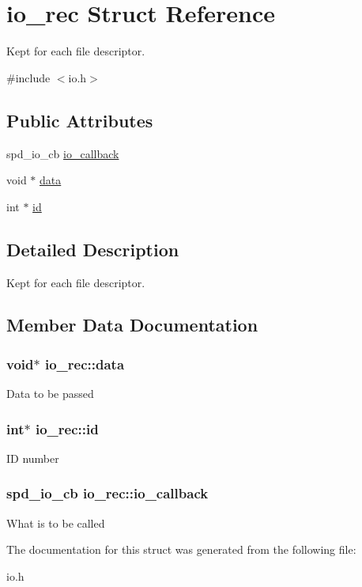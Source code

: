 \hypertarget{structio__rec}{
\section{io\_\-rec Struct Reference}
\label{structio__rec}
}


Kept for each file descriptor.  




{\ttfamily \#include $<$io.h$>$}

\subsection*{Public Attributes}
\begin{DoxyCompactItemize}
\item 
spd\_\-io\_\-cb \hyperlink{structio__rec_a8a4ed0da41995f158651e76ed0aa57d1}{io\_\-callback}
\item 
void $\ast$ \hyperlink{structio__rec_ae75ebfdf9bef281f3dc6aeecc2b91454}{data}
\item 
int $\ast$ \hyperlink{structio__rec_a1275a05e621878d0d00611b6bfeac939}{id}
\end{DoxyCompactItemize}


\subsection{Detailed Description}
Kept for each file descriptor. 

\subsection{Member Data Documentation}
\hypertarget{structio__rec_ae75ebfdf9bef281f3dc6aeecc2b91454}{
\subsubsection[{data}]{\setlength{\rightskip}{0pt plus 5cm}void$\ast$ {\bf io\_\-rec::data}}}
\label{structio__rec_ae75ebfdf9bef281f3dc6aeecc2b91454}
Data to be passed \hypertarget{structio__rec_a1275a05e621878d0d00611b6bfeac939}{
\subsubsection[{id}]{\setlength{\rightskip}{0pt plus 5cm}int$\ast$ {\bf io\_\-rec::id}}}
\label{structio__rec_a1275a05e621878d0d00611b6bfeac939}
ID number \hypertarget{structio__rec_a8a4ed0da41995f158651e76ed0aa57d1}{
\subsubsection[{io\_\-callback}]{\setlength{\rightskip}{0pt plus 5cm}spd\_\-io\_\-cb {\bf io\_\-rec::io\_\-callback}}}
\label{structio__rec_a8a4ed0da41995f158651e76ed0aa57d1}
What is to be called 

The documentation for this struct was generated from the following file:\begin{DoxyCompactItemize}
\item 
io.h\end{DoxyCompactItemize}
